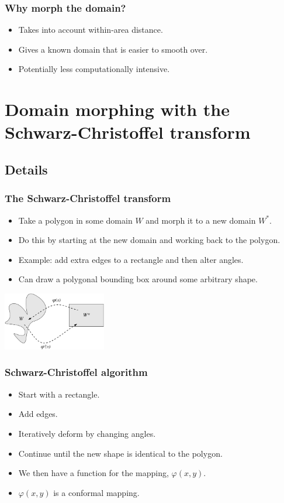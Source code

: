 \documentclass[ignorenonframetext]{beamer} %
\newcommand{\bc}{\begin{center}}
\newcommand{\ec}{\end{center}}
\newcommand{\bi}{\begin{itemize}}
\newcommand{\ei}{\end{itemize}}
\begin{document}
\begin{frame}
	\frametitle{Why morph the domain?}
       \bi
         \item Takes into account within-area distance.
         \item Gives a known domain that is easier to smooth over.
         \item Potentially less computationally intensive. 
        \ei
\end{frame}


\section{Domain morphing with the Schwarz-Christoffel transform}

\subsection{Details}

\begin{frame}
	\frametitle{The Schwarz-Christoffel transform}
       \bi
         \item Take a polygon in some domain $W$ and morph it to a new domain $W^*$.
         \item Do this by starting at the new domain and working back to the polygon.
         \item Example: add extra edges to a rectangle and then alter angles.
         \item Can draw a polygonal bounding box around some arbitrary shape.
        \ei
        \bc
              \includegraphics[height=1in]{figs/mappingdia}
       \ec
\end{frame}


\begin{frame}
	\frametitle{Schwarz-Christoffel algorithm}
       \bi
         \item Start with a rectangle.
         \item Add edges.
         \item Iteratively deform by changing angles.
         \item Continue until the new shape is identical to the polygon.
         \item We then have a function for the mapping, $\varphi(x,y)$.
         \item $\varphi(x,y)$ is a conformal mapping.
        \ei 
\end{frame}
\end{document}
